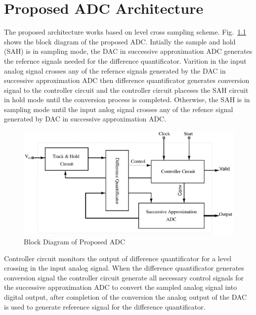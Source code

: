 \chapter{Proposed ADC Architecture}

\par
\hspace{1.2cm} The proposed architecture works based on level cross sampling scheme. Fig.~\ref{fig:PADC} shows the block diagram of the proposed ADC. Intially the sample and hold (SAH) is in sampling mode, the DAC in successive approximation ADC generates the refernce signals needed for the difference quantificator. Varition in the input analog signal crosses any of the refernce signals generated by the DAC in successive approximation ADC then difference quantificator generates conversion signal to the controller circuit and the controller circuit placeses the SAH circuit in hold mode until the conversion process is completed. Otherwise, the SAH is in sampling mode until the input anlog signal crosses any of the refence signal generated by DAC in successive approximation ADC. 

\begin{figure}[h]
	\begin{center}
		\includegraphics[scale=0.59]{./Figures/PADC.ps}
		\caption{Block Diagram of Proposed ADC}
		\label{fig:PADC}
	\end{center}
\end{figure}

\par
\hspace{0.6cm}  Controller circuit monitors the output of difference quantificator for a level crossing in the input analog signal. When the difference quantificator generates conversion signal the controller circuit generate all necessary control signals for the successive approximation ADC to convert the sampled analog signal into digital output, after completion of the conversion the analog output of the DAC is used to generate reference signal for the difference quantificator.

